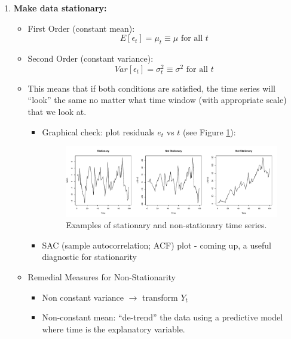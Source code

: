 \documentclass[12pt]{../notes}
\begin{document}
\begin{enumerate}[leftmargin=*]
\item \textbf{Make data stationary:}

\begin{itemize}
\item First Order (constant mean):
\[E\left[\epsilon_t\right] = \mu_t \equiv \mu \text{ for all } t\]
\item Second Order (constant variance):
\[Var\left[\epsilon_t\right] = \sigma^2_t \equiv \sigma^2 \text{ for all } t\]
\item This means that if both conditions are satisfied, the time series will ``look'' the same no matter what time window (with appropriate scale) that we look at. 

\begin{itemize}
\item Graphical check: plot residuals $e_t$ vs $t$ (see Figure \ref{fig:tsExamples}):

\begin{figure}
\centering
\includegraphics[width=\textwidth]{../figures/module6/tsExamples.pdf}
\caption{Examples of stationary and non-stationary time series.}
\label{fig:tsExamples}
\end{figure}

\item SAC (sample autocorrelation; ACF) plot - coming up, a useful diagnostic for stationarity
\end{itemize}

\item Remedial Measures for Non-Stationarity
\begin{itemize}
\item Non constant variance $\rightarrow$ transform $Y_t$

\item Non-constant mean: ``de-trend'' the data using a predictive model where time is the explanatory variable. 


\end{itemize}
\end{itemize}
\end{enumerate}
\end{document}
